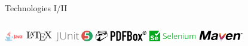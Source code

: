 \documentclass[
    ngerman,%
    authorontitle=true,
]{bfhbeamer}
\begin{document}
\begin{frame}{Technologies I/II}
\begin{columns}
            \begin{column}{0.3\textwidth}
                \includegraphics[height=0.5cm]{pictures/Java-Logo}
                \vspace{1em}
                \includegraphics[height=0.5cm]{pictures/LaTeX_logo}
                \vspace{1em}
                \includegraphics[height=0.5cm]{pictures/JUnit_5_Logo}
                \vspace{1em}
                \includegraphics[height=0.5cm]{pictures/Apache_PDFBox_logo}
                \vspace{1em}
                \includegraphics[height=0.5cm]{pictures/Selenium_logo}
                \vspace{1em}
                \includegraphics[height=0.5cm]{pictures/Apache_Maven_logo}
            \end{column}
        \end{columns}
    \end{frame}
\end{document}
